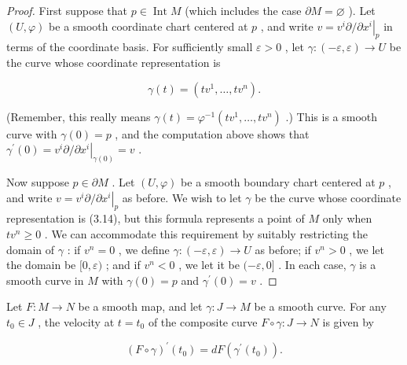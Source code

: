 \begin{proof}
\leanok
First suppose that $p \in  \operatorname{Int}M$ (which includes the case $\partial M = \varnothing$ ). Let $\left( {U,\varphi }\right)$ be a smooth coordinate chart centered at $p$ , and write $v = {v}^{i}\partial /{\left. \partial {x}^{i}\right| }_{p}$ in terms of the coordinate basis. For sufficiently small $\varepsilon  > 0$ , let $\gamma  : \left( {-\varepsilon ,\varepsilon }\right)  \rightarrow  U$ be the curve whose coordinate representation is

\[
\gamma \left( t\right)  = \left( {t{v}^{1},\ldots , t{v}^{n}}\right) . \tag{3.14}
\]

(Remember, this really means $\gamma \left( t\right)  = {\varphi }^{-1}\left( {t{v}^{1},\ldots , t{v}^{n}}\right)$ .) This is a smooth curve with $\gamma \left( 0\right)  = p$ , and the computation above shows that ${\gamma }^{\prime }\left( 0\right)  = {v}^{i}\partial /{\left. \partial {x}^{i}\right| }_{\gamma \left( 0\right) } = v$ .

Now suppose $p \in  \partial M$ . Let $\left( {U,\varphi }\right)$ be a smooth boundary chart centered at $p$ , and write $v = {v}^{i}\partial /{\left. \partial {x}^{i}\right| }_{p}$ as before. We wish to let $\gamma$ be the curve whose coordinate representation is (3.14), but this formula represents a point of $M$ only when $t{v}^{n} \geq  0$ . We can accommodate this requirement by suitably restricting the domain of $\gamma$ : if ${v}^{n} = 0$ , we define $\gamma  : \left( {-\varepsilon ,\varepsilon }\right)  \rightarrow  U$ as before; if ${v}^{n} > 0$ , we let the domain be $\lbrack 0,\varepsilon )$ ; and if ${v}^{n} < 0$ , we let it be $( - \varepsilon ,0\rbrack$ . In each case, $\gamma$ is a smooth curve in $M$ with $\gamma \left( 0\right)  = p$ and ${\gamma }^{\prime }\left( 0\right)  = v$ .
\end{proof}

\begin{proposition}
\label{prop:3-24}
\leanok
{}
Let $F : M \rightarrow  N$ be a smooth map, and let $\gamma  : J \rightarrow  M$ be a smooth curve. For any ${t}_{0} \in  J$ , the velocity at $t = {t}_{0}$ of the composite curve $F \circ  \gamma  : J \rightarrow  N$ is given by

\[
{\left( F \circ  \gamma \right) }^{\prime }\left( {t}_{0}\right)  = {dF}\left( {{\gamma }^{\prime }\left( {t}_{0}\right) }\right) .
\]
\end{proposition}


